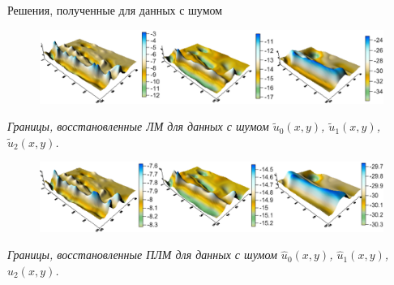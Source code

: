 \documentclass[10pt,pdf, mathserif, hyperref={unicode}]{beamer}
\begin{document}
\begin{frame}{Решения, полученные для данных с шумом}
	\begin{figure}
		\centering
		\includegraphics[height=0.2\textheight]{lm_noise}
	\end{figure}
	\centering\textit{Границы, восстановленные ЛМ для данных с шумом $\tilde{u}_0(x,y)$, $\tilde{u}_1(x,y)$, $\tilde{u}_2(x,y)$.}
	\begin{figure}
		\centering
		\includegraphics[height=0.2\textheight]{clm_noise}
	\end{figure}
	\centering\textit{Границы, восстановленные ПЛМ для данных с шумом $\hat{u}_0(x,y)$, $\hat{u}_1(x,y)$, $\hat{u}_2(x,y)$.}
\end{frame}
\end{document}
